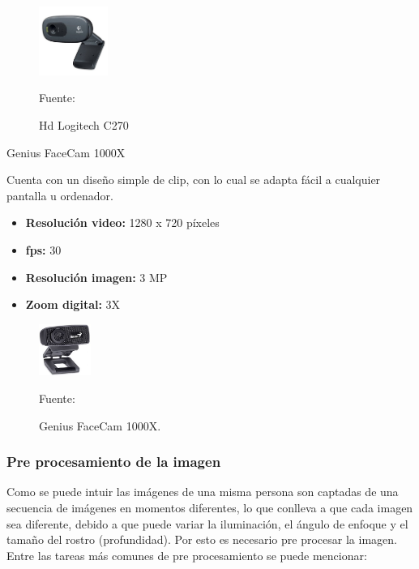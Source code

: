 \begin{enumerate}
\begin{figure}[ht]
\begin{center}
\includegraphics[width=0.2\textwidth]{Imagen10}
\end{center}
\begin{center}
\vskip -0.5cm
\caption{\small{Hd Logitech C270}}
{\small{Fuente: \cite{Amazon}}}
\end{center}
\end{figure}

{\bf\item[3. ] Genius FaceCam 1000X} \vskip 0.1cm
Cuenta con un diseño simple de clip, con lo cual se adapta fácil a cualquier pantalla u ordenador.
\begin{itemize}
\item[•] {\bf Resolución video:}
1280 x 720 píxeles
\item[•] {\bf fps:}
30
\item[•] {\bf Resolución imagen:}
3 MP
\item[•] {\bf Zoom digital:}
3X
\end{itemize}

\begin{figure}[ht]
\begin{center}
\includegraphics[width=0.15\textwidth]{Imagen11}
\end{center}
\begin{center}
\vskip -0.5cm
\caption{\small{Genius FaceCam 1000X.}}
{\small{Fuente: \cite{Amazon}}}
\end{center}
\end{figure}

\end{enumerate}
\vskip 1cm

\subsubsection{Pre procesamiento de la imagen}
Como se puede intuir las imágenes de una misma persona son captadas de una secuencia de imágenes en momentos diferentes, lo que conlleva a que cada imagen sea diferente, debido a que puede variar la iluminación, el ángulo de enfoque y el tamaño del rostro (profundidad). Por esto es necesario pre procesar la imagen. Entre las tareas más comunes de pre procesamiento se puede mencionar:

